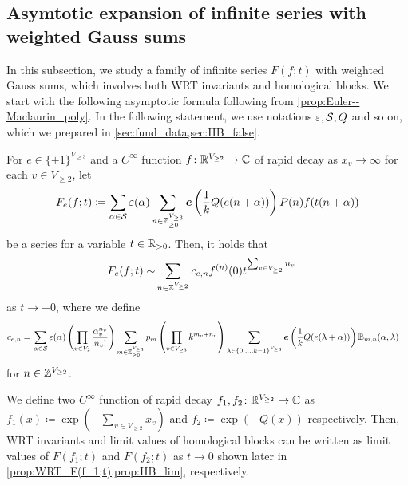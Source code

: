 \documentclass[11pt,a4paper,lualatex]{amsart}
\numberwithin{equation}{section} %
\begin{document}

\subsection{Asymtotic expansion of infinite series with weighted Gauss sums} \label{subsec:asymp_Gauss}


In this subsection, we study a family of infinite series $ F(f; t) $ with weighted Gauss sums, which involves both WRT invariants and homological blocks.
We start with the following asymptotic formula following from \cref{prop:Euler--Maclaurin_poly}.
In the following statement, we use notations $ \varepsilon, \mathcal{S}, Q $ and so on, which we prepared in \cref{sec:fund_data,sec:HB_false}.

\begin{cor} \label{cor:asymp_F(f; t)}
	For $ e \in \{ \pm 1 \}^{V_{\ge 3}} $ and a $ C^\infty $ function $ f \colon \mathbb{R}^{V_{\ge 2}} \to \mathbb{C} $ of rapid decay as $ x_v \to \infty $ for each $ v \in V_{\ge 2} $, let
	\[
	F_e(f; t) \coloneqq 
	\sum_{\alpha \in \calS} \veps(\alpha)
	\sum_{n \in \Z_{\ge 0}^{V_{\ge 3}}}
	\bm{e}\left( \frac{1}{k} Q(e(n + \alpha)) \right) P(n) f(t(n + \alpha))
	\]
	be a series for a variable $ t \in \mathbb{R}_{>0} $.
	Then, it holds that
	\begin{align} \label{eq:asymp_F(f; t)}
		F_e(f; t) 
		\sim
		&\sum_{n \in \mathbb{Z}^{V_{\ge 2}}} c_{e, n} f^{(n)}(0) t^{\sum_{v \in V_{\ge 2}} n_v}
	\end{align}
	as $ t \to +0 $, where we define
	\begin{align}
		c_{e, n} = \,
		&\sum_{\alpha \in \mathcal{S}} \varepsilon(\alpha)
		\left( \prod_{v \in V_2} \frac{\alpha_v^{n_v}}{n_v!} \right)
		\sum_{m \in \mathbb{Z}_{\ge 0}^{V_{\ge 3}}} p_m \left( \prod_{v \in V_{\ge 3}} k^{m_v + n_v} \right)
		\sum_{\lambda \in \{ 0, \dots, k-1 \}^{V_{\ge 3}}}
		\bm{e}\left( \frac{1}{k} Q(e(\lambda + \alpha)) \right) \mathbb{B}_{m, n}(\alpha, \lambda)
	\end{align}
	for $ n \in \mathbb{Z}^{V_{\ge 2}} $.
\end{cor}

We define two $ C^\infty $ function of rapid decay $ f_1, f_2 \colon \mathbb{R}^{V_{\ge 2}} \to \mathbb{C} $ 
as $ f_1(x) \coloneqq \exp(-\sum_{v \in V_{\ge 2}} x_v) $ and $ f_2 \coloneqq \exp(-Q(x)) $ respectively.
Then, WRT invariants and limit values of homological blocks can be written as limit values of $ F(f_1; t) $ and $ F(f_2; t) $ as $ t \to 0 $ shown later in \cref{prop:WRT_F(f_1;t),prop:HB_lim}, respectively.
\end{document}
